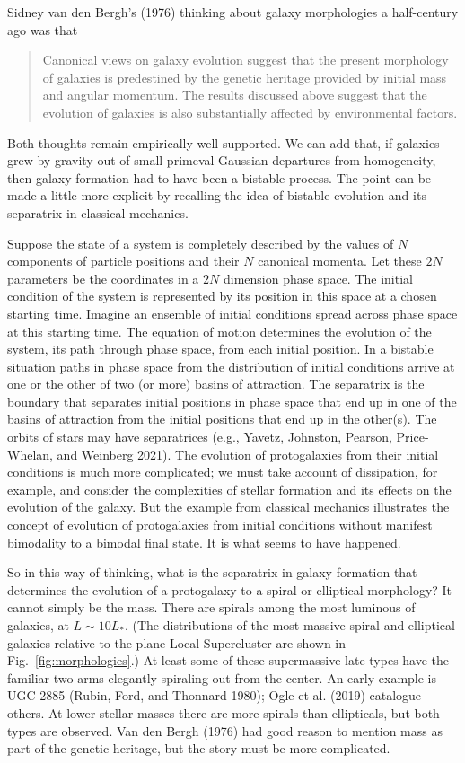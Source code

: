 \documentclass[fleqn,12pt]{article}
\begin{document}
Sidney van den Bergh's (1976) thinking about galaxy morphologies a half-century ago was that 
\begin{quotation}\noindent
\noindent Canonical views on galaxy evolution suggest that the present morphology of galaxies is predestined by the genetic heritage provided by initial mass and angular momentum. The results discussed above suggest that the evolution of galaxies is also substantially affected by environmental factors.
\end{quotation}
Both thoughts remain empirically well supported. We can add that, if galaxies grew by gravity out of small primeval Gaussian departures from homogeneity, then galaxy formation had to have been a bistable process. The point can be made a little more explicit by recalling the idea of bistable evolution and its separatrix in classical mechanics.

Suppose the state of a system is completely described by the values of $N$ components of particle positions and their $N$ canonical momenta. Let these $2N$ parameters be the coordinates in a $2N$ dimension phase space. The initial condition of the system is represented by its position in this space at a chosen starting time. Imagine an ensemble of initial conditions spread across phase space at this starting time. The equation of motion determines the evolution of the system, its path through phase space, from each initial position. In a bistable situation paths in phase space from the distribution of initial conditions arrive at one or the other of two (or more) basins of attraction. The separatrix is the boundary that separates initial positions in phase space that end up in one of the basins of attraction from the initial positions that end up in the other(s). The orbits of stars may have separatrices (e.g., Yavetz, Johnston, Pearson, Price-Whelan, and Weinberg 2021). The evolution of protogalaxies from their initial conditions is much more complicated; we must take account of dissipation, for example, and consider the complexities of stellar formation and its effects on the evolution of the galaxy. But the example from classical mechanics illustrates the concept of evolution of protogalaxies from initial conditions without manifest bimodality to a bimodal final state. It is what seems to have happened.

So in this way of thinking, what is the separatrix in galaxy formation that determines the evolution of a protogalaxy to a spiral or elliptical morphology? It cannot simply be the mass. There are spirals among the most luminous of galaxies, at $L \sim 10L_\ast$. (The distributions of the most massive spiral and elliptical galaxies relative to the plane Local Supercluster are shown in Fig.~\ref{fig:morphologies}.) At least some of these supermassive late types have the familiar two arms elegantly spiraling out from the center. An early example is UGC 2885 (Rubin, Ford, and Thonnard 1980); Ogle et al. (2019) catalogue others.  At lower stellar masses there are more spirals than ellipticals, but both types are observed. Van den Bergh (1976) had good reason to mention mass as part of the genetic heritage, but the story must be more complicated.
\end{document}
